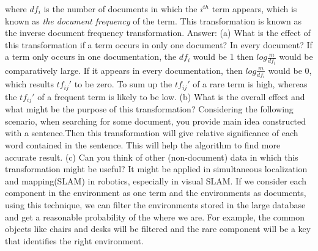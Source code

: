 \documentclass[paper=a4, fontsize=11pt]{scrartcl} %
\numberwithin{equation}{section} %
\numberwithin{figure}{section} %
\numberwithin{table}{section} %
\begin{document}
where $df_i$ is the number of documents in which the $i^	{th}$ term appears, which is known as \textit{the document frequency} of the term. This transformation is known as the inverse document frequency transformation.
\newline
\newline
Answer:
\newline
\newline
(a) What is the effect of this transformation if a term occurs in only one document? In every document?
\newline
\newline
If a term only occurs in one documentation, the $df_i$ would be 1 then $log\frac{m}{df_i}$ would be comparatively large. If it appears in every documentation, then $log\frac{m}{df_i}$ would be 0, which results $tf_{ij}'$ to be zero. To sum up the $tf_{ij}'$ of a rare term is high, whereas the $tf_{ij}'$ of a frequent term is likely to be low. 
\newline
\newline
(b) What is the overall effect and what might be the purpose of this transformation?
\newline
\newline
Considering the following scenario, when searching for some document, you provide main idea constructed with a sentence.Then this transformation will give relative significance of each word contained in the sentence. This will help the algorithm to find more accurate result. 
\newline
\newline
(c) Can you think of other (non-document) data in which this transformation might be useful?
\newline
\newline
It might be applied in simultaneous localization and mapping(SLAM) in robotics, especially in visual SLAM. If we consider each component in the environment as one term and the environments as documents, using this technique, we can filter the environments stored in the large database and get a reasonable probability of the where we are. For example, the common objects like chairs and desks will be filtered and the rare component will be a key that identifies the right environment.
\end{document}
